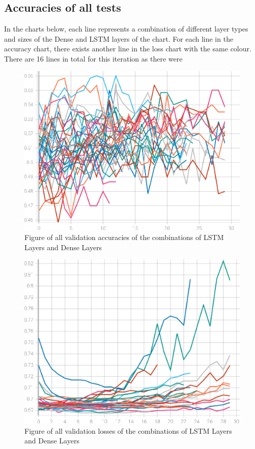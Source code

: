 \subsection{Accuracies of all tests}
In the charts below, each line represents a combination of different layer types and sizes of the Dense and LSTM layers of the chart.
For each line in the accuracy chart, there exists another line in the loss chart with the same colour. There are 16 lines in total
for this iteration as there were 
\begin{figure}[ht]
    \centering
    \includegraphics[width=0.95\columnwidth]{figures/results/cnn_iteration2_all_accuracy.eps}
    \caption[Figure of accuracies and losses for Iteration 2]{Figure of all validation accuracies of the combinations of LSTM Layers and Dense Layers}
    \label{fig:iteration2_all_accuracy}
\end{figure}
\FloatBarrier
\begin{figure}[ht]
    \centering
    \includegraphics[width=0.95\columnwidth]{figures/results/cnn_iteration2_all_loss.eps}
    \caption[Figure of accuracies and losses for Iteration 2]{Figure of all validation losses of the combinations of LSTM Layers and Dense Layers}
    \label{fig:iteration2_all_loss}
\end{figure}
\FloatBarrier

